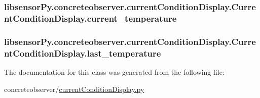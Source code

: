 \subsubsection[{current\+\_\+temperature}]{\setlength{\rightskip}{0pt plus 5cm}libsensor\+Py.\+concreteobserver.\+current\+Condition\+Display.\+Current\+Condition\+Display.\+current\+\_\+temperature}\label{classlibsensorPy_1_1concreteobserver_1_1currentConditionDisplay_1_1CurrentConditionDisplay_a5caceceda5df732565a78ab2917501f3}
\hypertarget{classlibsensorPy_1_1concreteobserver_1_1currentConditionDisplay_1_1CurrentConditionDisplay_a535abe031e69dda48b4e86a2db294a7e}{}
\subsubsection[{last\+\_\+temperature}]{\setlength{\rightskip}{0pt plus 5cm}libsensor\+Py.\+concreteobserver.\+current\+Condition\+Display.\+Current\+Condition\+Display.\+last\+\_\+temperature}\label{classlibsensorPy_1_1concreteobserver_1_1currentConditionDisplay_1_1CurrentConditionDisplay_a535abe031e69dda48b4e86a2db294a7e}


The documentation for this class was generated from the following file\+:\begin{DoxyCompactItemize}
\item 
concreteobserver/\hyperlink{currentConditionDisplay_8py}{current\+Condition\+Display.\+py}\end{DoxyCompactItemize}
